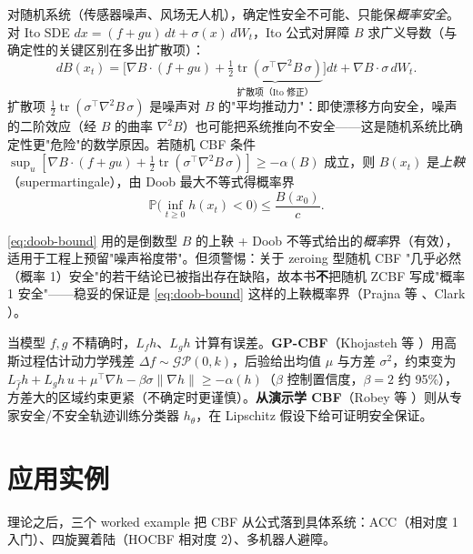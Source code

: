 对随机系统（传感器噪声、风场无人机），确定性安全不可能、只能保\emph{概率安全}。对 Ito SDE $dx=(f+gu)\,dt+\sigma(x)\,dW_t$，Ito 公式对屏障 $B$ 求广义导数（与确定性的关键区别在多出扩散项）：
\begin{equation}
dB(x_t)=\Big[\nabla B\cdot(f+gu)+\underbrace{\tfrac12\operatorname{tr}(\sigma^\top\nabla^2B\,\sigma)}_{\text{扩散项（Ito 修正）}}\Big]dt+\nabla B\cdot\sigma\,dW_t.
\label{eq:ito-barrier}
\end{equation}
扩散项 $\tfrac12\operatorname{tr}(\sigma^\top\nabla^2B\,\sigma)$ 是噪声对 $B$ 的"平均推动力"：即使漂移方向安全，噪声的二阶效应（经 $B$ 的曲率 $\nabla^2B$）也可能把系统推向不安全——这是随机系统比确定性更"危险"的数学原因。若随机 CBF 条件 $\sup_u[\nabla B\cdot(f+gu)+\tfrac12\operatorname{tr}(\sigma^\top\nabla^2B\,\sigma)]\ge-\alpha(B)$ 成立，则 $B(x_t)$ 是\emph{上鞅}（supermartingale），由 Doob 最大不等式得概率界
\begin{equation}
\mathbb P\Big(\inf_{t\ge0}h(x_t)<0\Big)\le\frac{B(x_0)}{c}.
\label{eq:doob-bound}
\end{equation}

\begin{remark}
\cref{eq:doob-bound} 用的是倒数型 $B$ 的上鞅 + Doob 不等式给出的\emph{概率}界（有效），适用于工程上预留"噪声裕度带"。但须警惕：关于 zeroing 型随机 CBF "几乎必然（概率 1）安全"的若干结论已被指出存在缺陷，故本书\textbf{不}把随机 ZCBF 写成"概率 1 安全"——稳妥的保证是 \cref{eq:doob-bound} 这样的上鞅概率界（Prajna 等 \cite{prajna2007barrier}、Clark \cite{clark2021stochastic}）。
\end{remark}

当模型 $f,g$ 不精确时，$L_fh$、$L_gh$ 计算有误差。\textbf{GP-CBF}（Khojasteh 等 \cite{khojasteh2020gpcbf}）用高斯过程估计动力学残差 $\Delta f\sim\mathcal{GP}(0,k)$，后验给出均值 $\mu$ 与方差 $\sigma^2$，约束变为 $L_{\hat f}h+L_gh\,u+\mu^\top\nabla h-\beta\sigma\|\nabla h\|\ge-\alpha(h)$（$\beta$ 控制置信度，$\beta=2$ 约 95\%），方差大的区域约束更紧（不确定时更谨慎）。\textbf{从演示学 CBF}（Robey 等 \cite{robey2020learning}）则从专家安全/不安全轨迹训练分类器 $h_\theta$，在 Lipschitz 假设下给可证明安全保证。

\section{应用实例}
\label{sec:cbf-apps}

理论之后，三个 worked example 把 CBF 从公式落到具体系统：ACC（相对度 1 入门）、四旋翼着陆（HOCBF 相对度 2）、多机器人避障。

